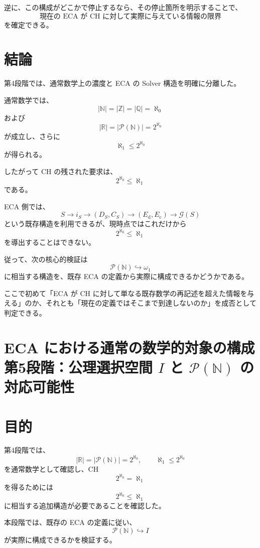 \documentclass[a4paper,11pt]{article}
\newcommand{\N}{\mathbb{N}}
\newcommand{\Z}{\mathbb{Z}}
\newcommand{\Q}{\mathbb{Q}}
\newcommand{\R}{\mathbb{R}}
\newcommand{\Pow}{\mathcal{P}}
\begin{document}
逆に、この構成がどこかで停止するなら、その停止箇所を明示することで、
\[
\boxed{
\text{現在の ECA が CH に対して実際に与えている情報の限界}
}
\]
を確定できる。

\section{結論}

第4段階では、通常数学上の濃度と ECA の Solver 構造を明確に分離した。

通常数学では、
\[
\boxed{
|\N|=|\Z|=|\Q|=\aleph_0
}
\]
および
\[
\boxed{
|\R|=|\Pow(\N)|=2^{\aleph_0}
}
\]
が成立し、さらに
\[
\boxed{
\aleph_1\leq2^{\aleph_0}
}
\]
が得られる。

したがって CH の残された要求は、
\[
\boxed{
2^{\aleph_0}\leq\aleph_1
}
\]
である。

ECA 側では、
\[
S
\longrightarrow
i_S
\longrightarrow
(D_S,C_S)
\longrightarrow
(E_{\mathrm{d}},E_{\mathrm c})
\longrightarrow
\mathcal G(S)
\]
という既存構造を利用できるが、現時点ではこれだけから
\[
2^{\aleph_0}\leq\aleph_1
\]
を導出することはできない。

従って、次の核心的検証は
\[
\boxed{
\Pow(\N)\hookrightarrow\omega_1
}
\]
に相当する構造を、既存 ECA の定義から実際に構成できるかどうかである。

ここで初めて「ECA が CH に対して単なる既存数学の再記述を超えた情報を与える」のか、それとも「現在の定義ではそこまで到達しないのか」を成否として判定できる。






\section{ECA における通常の数学的対象の構成 \large{第5段階：公理選択空間 $I$ と $\mathcal{P}(\mathbb{N})$ の対応可能性}}

\section{目的}

第4段階では、
\[
|\mathbb R|=|\mathcal{P}(\mathbb{N})|=2^{\aleph_0},
\qquad
\aleph_1\leq 2^{\aleph_0}
\]
を通常数学として確認し、CH
\[
2^{\aleph_0}=\aleph_1
\]
を得るためには
\[
2^{\aleph_0}\leq\aleph_1
\]
に相当する追加構造が必要であることを確認した。

本段階では、既存の ECA の定義に従い、
\[
\boxed{\mathcal{P}(\mathbb{N})\hookrightarrow I}
\]
が実際に構成できるかを検証する。
\end{document}
